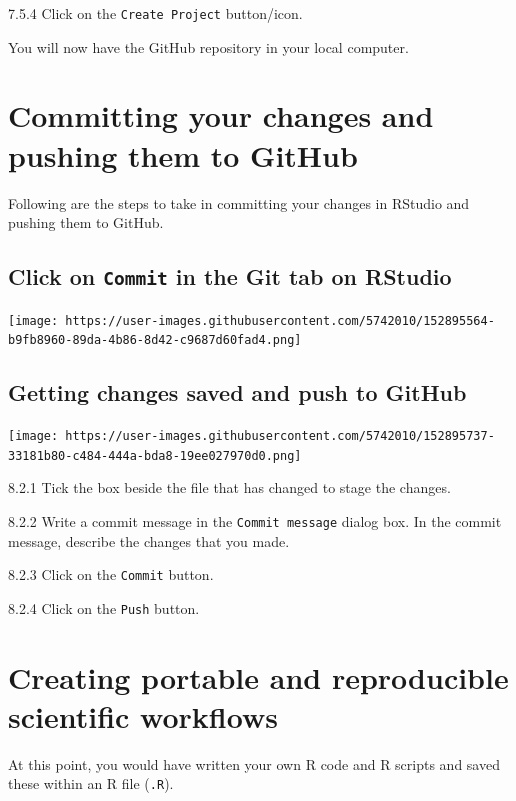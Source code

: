 \documentclass[
  12pt,
]{book}
\begin{document}
7.5.4 Click on the \texttt{Create\ Project} button/icon.

You will now have the GitHub repository in your local computer.

\hypertarget{commit-and-push}{%
\chapter{Committing your changes and pushing them to GitHub}\label{commit-and-push}}

Following are the steps to take in committing your changes in RStudio and pushing them to GitHub.

\hypertarget{click-on-commit-in-the-git-tab-on-rstudio}{%
\section{\texorpdfstring{Click on \texttt{Commit} in the Git tab on RStudio}{Click on Commit in the Git tab on RStudio}}\label{click-on-commit-in-the-git-tab-on-rstudio}}

\texttt{[image: https://user-images.githubusercontent.com/5742010/152895564-b9fb8960-89da-4b86-8d42-c9687d60fad4.png]}

\hypertarget{getting-changes-saved-and-push-to-github}{%
\section{Getting changes saved and push to GitHub}\label{getting-changes-saved-and-push-to-github}}

\texttt{[image: https://user-images.githubusercontent.com/5742010/152895737-33181b80-c484-444a-bda8-19ee027970d0.png]}

8.2.1 Tick the box beside the file that has changed to stage the changes.

8.2.2 Write a commit message in the \texttt{Commit\ message} dialog box. In the commit message, describe the changes that you made.

8.2.3 Click on the \texttt{Commit} button.

8.2.4 Click on the \texttt{Push} button.

\hypertarget{portable-reproducible}{%
\chapter{Creating portable and reproducible scientific workflows}\label{portable-reproducible}}

At this point, you would have written your own R code and R scripts and saved these within an R file (\texttt{.R}).
\end{document}
